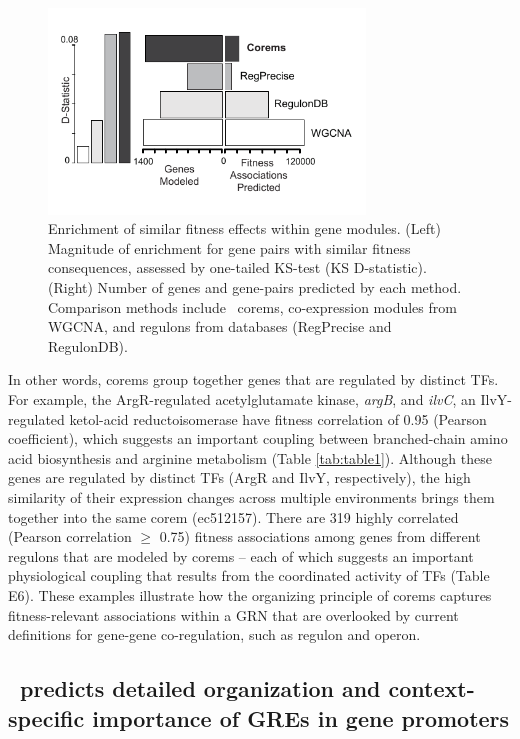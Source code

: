 \begin{figure}[h!]
    \centering
    \includegraphics[width=0.75\textwidth]{figures/egrin2_corem_fitness}
 	\caption[\egrine~Model Validation: Fitness contributions]{Enrichment of similar fitness effects within gene modules. (Left) Magnitude of enrichment for gene pairs with similar fitness consequences, assessed by one-tailed KS-test (KS D-statistic). (Right) Number of genes and gene-pairs predicted by each method.  Comparison methods include \egrine~corems, co-expression modules from WGCNA, and regulons from databases (RegPrecise and RegulonDB). 
}
    \label{fig:egrin2:2:B}
\end{figure}

In other words, corems group together genes that are regulated by distinct TFs. For example, the ArgR-regulated acetylglutamate kinase, \textit{argB}, and \textit{ilvC}, an IlvY-regulated ketol-acid reductoisomerase have fitness correlation of 0.95 (Pearson coefficient), which suggests an important coupling between branched-chain amino acid biosynthesis and arginine metabolism (Table \ref{tab:table1}). Although these genes are regulated by distinct TFs (ArgR and IlvY, respectively), the high similarity of their expression changes across multiple environments brings them together into the same corem (ec512157). There are 319 highly correlated (Pearson correlation $\geq$ 0.75) fitness associations among genes from different regulons that are modeled by corems – each of which suggests an important physiological coupling that results from the coordinated activity of TFs (Table E6). These examples illustrate how the organizing principle of corems captures fitness-relevant associations within a GRN that are overlooked by current definitions for gene-gene co-regulation, such as regulon and operon.

\subsection{\egrine~predicts detailed organization and context-specific importance of GREs in gene promoters}

